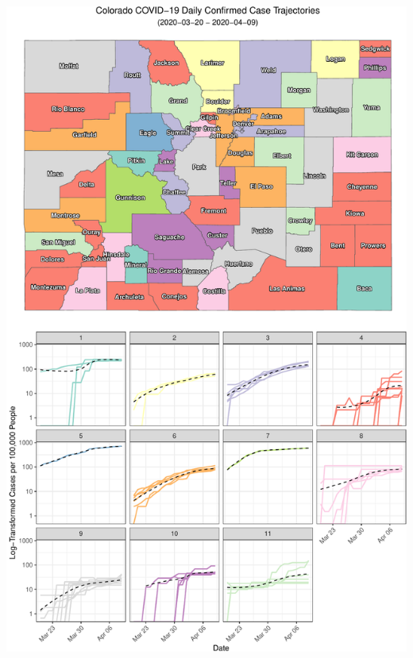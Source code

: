 \documentclass[]{article}
\begin{document}
\includegraphics{figs/county-clusters-smooth-log-1}
\end{document}
